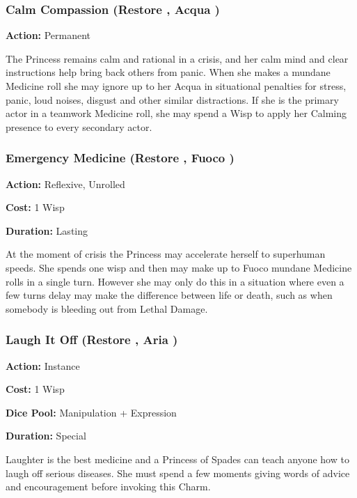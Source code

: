 \subsubsection*{Calm Compassion (Restore \textbullet, Acqua \textbullet)}

\noindent \textbf{Action:} Permanent 

\noindent The Princess remains calm and rational in a crisis, and her calm mind and clear instructions help bring back others from panic. When she makes a mundane Medicine roll she may ignore up to her Acqua in situational penalties for stress, panic, loud noises, disgust and other similar distractions. If she is the primary actor in a teamwork Medicine roll, she may spend a Wisp to apply her Calming presence to every secondary actor.

\subsubsection*{Emergency Medicine (Restore \textbullet, Fuoco \textbullet)}

\noindent \textbf{Action:} Reflexive, Unrolled

\noindent \textbf{Cost:} 1 Wisp

\noindent \textbf{Duration:} Lasting

\noindent At the moment of crisis the Princess may accelerate herself to superhuman speeds. She spends one wisp and then may make up to Fuoco mundane Medicine rolls in a single turn. However she may only do this in a situation where even a few turns delay may make the difference between life or death, such as when somebody is bleeding out from Lethal Damage. 

\subsubsection*{Laugh It Off (Restore \textbullet, Aria \textbullet)}

\noindent \textbf{Action:} Instance

\noindent \textbf{Cost:} 1 Wisp

\noindent \textbf{Dice Pool:} Manipulation + Expression

\noindent \textbf{Duration:} Special

\noindent Laughter is the best medicine and a Princess of Spades can teach anyone how to laugh off serious diseases. She must spend a few moments giving words of advice and encouragement before invoking this Charm. 

